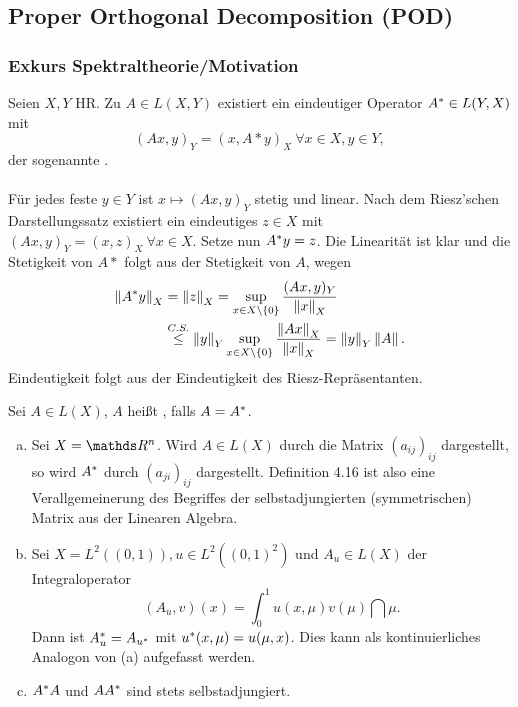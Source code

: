 \subsection{Proper Orthogonal Decomposition (POD)}
\subsubsection{Exkurs Spektraltheorie/Motivation}

Seien $X,Y$ HR.
Zu $A\in L(X,Y)$ existiert ein eindeutiger Operator $A^\ast\in L(Y,X)$ mit
\[
(Ax,y)_Y = (x,A*y)_X ~\forall x\in X,y\in Y,
\]
der sogenannte .\\

\\
Für jedes feste $y\in Y$ ist $x\mapsto (Ax,y)_Y$ stetig und linear.
Nach dem Riesz'schen Darstellungssatz existiert ein eindeutiges $z\in X$ mit $(Ax,y)_Y= (x,z)_X~\forall x\in X$.
Setze nun $A^\ast y=z$.
Die Linearität ist klar und die Stetigkeit von $A*$ folgt aus der Stetigkeit von $A$, wegen
\begin{align*}
\left\Vert A^\ast y\right\Vert_X &= \left\Vert z\right\Vert_X = \sup\limits_{x\in X\backslash\{0\}} \frac{(Ax,y)_Y}{\left\Vert x\right\Vert_X}\\
&\stackrel{C.S.}{\le} \left\Vert y\right\Vert_Y \sup\limits_{x\in X\backslash\{0\}} \frac{\left\Vert Ax\right\Vert_X}{\left\Vert x\right\Vert_X} = \left\Vert y\right\Vert_Y\left\Vert A\right\Vert.
\end{align*}
Eindeutigkeit folgt aus der Eindeutigkeit des Riesz-Repräsentanten.

Sei $A\in L(X)$, $A$ heißt , falls $A=A^\ast$.

\begin{enumerate}[(a)]
	\item Sei $X=\R^n$.
	Wird $A\in L(X)$ durch die Matrix $(a_{ij})_{ij}$ dargestellt, so wird $A^\ast$ durch $(a_{ji})_{ij}$ dargestellt.
	Definition 4.16 ist also eine Verallgemeinerung des Begriffes der selbstadjungierten (symmetrischen) Matrix aus der Linearen Algebra.
	\item Sei $X=L^2((0,1)), u\in L^2((0,1)^2)$ und $A_u\in L(X)$ der Integraloperator
	\[
	(A_u,v)(x) = \int_0^1 u(x,\mu)v(\mu)\dint \mu.
	\]
	Dann ist $A_u^\ast = A_{u^\ast}$ mit $u^\ast(x,\mu)=u(\mu,x)$.
	Dies kann als kontinuierliches Analogon von (a) aufgefasst werden.
	\item $A^\ast A$ und $AA^\ast$ sind stets selbstadjungiert.
\end{enumerate}

